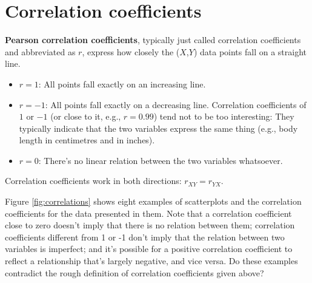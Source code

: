 \documentclass[a4paper]{tufte-book}\usepackage[]{graphicx}\usepackage[]{xcolor}
\newcommand{\term}[1]{\textbf{#1}}
\begin{document}
\section{Correlation coefficients}
\term{Pearson correlation coefficients}, typically just called
correlation coefficients and abbreviated as $r$,
express how closely the ($X$,$Y$) data points fall on a straight line.

\begin{itemize}
 \item $r = 1$: All points fall exactly on an increasing line.
 \item $r = -1$: All points fall exactly on a decreasing line.
 Correlation coefficients of $1$ or $-1$ (or close to it, e.g., $r = 0.99$)
 tend not to be too interesting: They typically indicate that the two variables
 express the same thing (e.g., body length in centimetres and in inches).
 \item $r = 0$: There's no linear relation between the two variables whatsoever.
\end{itemize}

Correlation coefficients work in both directions: $r_{XY} = r_{YX}$.

Figure \ref{fig:correlations} shows eight examples of scatterplots
and the correlation coefficients for the data presented in them.
Note that a correlation coefficient close to zero doesn't imply
that there is no relation between them;
correlation coefficients different from 1 or -1 don't imply that
the relation between two variables is imperfect;
and it's possible for a positive correlation coefficient to reflect
a relationship that's largely negative, and vice versa.
Do these examples contradict the rough definition of correlation coefficients
given above?
\end{document}

